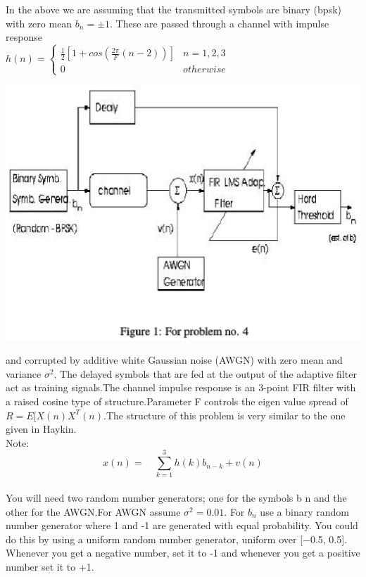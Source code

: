 \documentclass[journal,12pt,onecolumn]{IEEEtran}
\begin{document}
\begin{enumerate}
\bigskip
\bigskip
In the above we are assuming that the transmitted symbols are binary (bpsk) with zero mean $b_n=\pm 1$. These are passed through a channel with impulse response\\
\medskip
$h(n)=\begin{cases}
\frac{1}{2}[1+cos(\frac{2\pi}{F}{(n-2)})]& n=1,2,3\\
0 & otherwise
\end{cases}$\\
\medskip
\begin{center}
\includegraphics[scale=.8]{figure3.eps}\\
\end{center}
\smallskip
and corrupted by additive white Gaussian noise (AWGN) with zero mean and variance $\sigma^2$. The delayed symbols that are fed at the output of the adaptive filter act as training signals.The channel impulse response is an 3-point FIR filter with a raised cosine type of structure.Parameter F controls the eigen value spread of $R=E[X(n)X^T(n)$.The structure of this problem is very similar to the one given in Haykin.\\
\medskip
Note:\\ 
\medskip
$$x(n)=\quad\sum_{k=1}^{3}h(k)b_{n-k}+v(n)$$\\
\medskip
You will need two random number generators; one for the symbols b n and the other for the AWGN.For AWGN assume $\sigma^2=0.01.$ For $b_n$ use a binary random number generator where 1 and -1 are generated with equal probability. You could do this by using a uniform random number generator, uniform over [−0.5, 0.5]. Whenever you get a negative number, set it to -1 and whenever you get a positive number set it to +1.

\end{enumerate}
\end{document}
